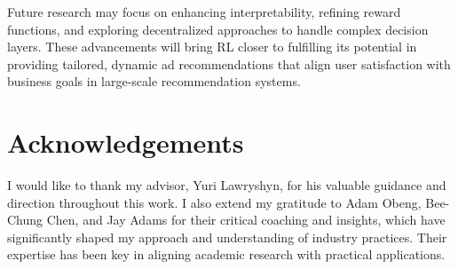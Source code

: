 \documentclass[final]{anthology-ch}         %
\begin{document}
Future research may focus on enhancing interpretability, refining reward functions, and exploring decentralized approaches to handle complex decision layers. These advancements will bring RL closer to fulfilling its potential in providing tailored, dynamic ad recommendations that align user satisfaction with business goals in large-scale recommendation systems.




\section*{Acknowledgements}
I would like to thank my advisor, Yuri Lawryshyn, for his valuable guidance and direction throughout this work. I also extend my gratitude to Adam Obeng, Bee-Chung Chen, and Jay Adams for their critical coaching and insights, which have significantly shaped my approach and understanding of industry practices. Their expertise has been key in aligning academic research with practical applications.


% 




% 


\end{document}
